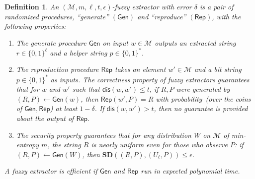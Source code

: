 \documentclass[11pt]{article}
\newcommand{\class}[1]{{\ensuremath{\mathsf{#1}}}}
\newcommand{\gen}{\ensuremath{\class{Gen}}\xspace}
\newcommand{\rep}{\ensuremath{\class{Rep}}\xspace}
\newcommand{\dis}{\ensuremath{\mathsf{dis}}}
\newtheorem{definition}[theorem]{Definition}
\begin{document}
\begin{definition}
\label{def:fuzzy extractor}
An $(\mathcal{M}, m, \ell, t, \epsilon)$-\emph{fuzzy extractor} with error $\delta$ is a pair of randomized procedures, ``generate'' $(\gen)$ and ``reproduce'' $(\rep)$, with the following properties: 
\begin{enumerate}
\item The generate procedure \gen on input $w\in \mathcal{M}$ outputs an extracted string $r\in\{0,1\}^\ell$ and a helper string $p\in\{0,1\}^*$.
\item The reproduction procedure \rep takes an element $w'\in \mathcal{M}$ and a bit string $p\in\{0,1\}^*$ as inputs.  The \emph{correctness} property of fuzzy extractors guarantees that for $w$ and $w'$ such that $\dis(w,w')\leq t$, if $R,P$ were generated by $(R,P)\leftarrow\gen(w)$, then $\rep(w',P)=R$ with probability~(over the coins of $\gen, \rep$) at least $1-\delta$.  If $\dis(w,w')>t$, then no guarantee is provided about the output of \rep.
\item The \emph{security} property guarantees that for any distribution $W$ on $\mathcal{M}$ of min-entropy $m$, the string $R$ is nearly uniform even for those who observe $P$:  if $(R,P)\leftarrow\gen (W)$, then $\mathbf{SD}((R,P),(U_\ell,P))\leq \epsilon$.
\end{enumerate}
A fuzzy extractor is efficient if $\gen$ and $\rep$ run in expected polynomial time.
\end{definition}
\end{document}
